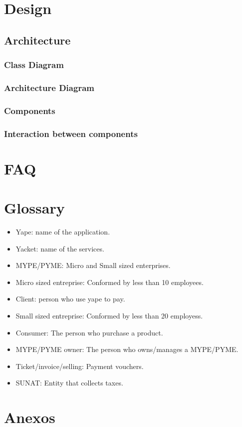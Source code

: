 \documentclass{article}
\begin{document}
\section{Design}
\subsection{Architecture}
\subsubsection{Class Diagram}
\subsubsection{Architecture Diagram}
\subsubsection{Components}
\subsubsection{Interaction between components}
\section{FAQ}
\section{Glossary}
\begin{itemize}
    \item Yape: name of the application.
    \item Yacket: name of the services.
    \item MYPE/PYME: Micro and Small sized enterprises.
    \item Micro sized entreprise: Conformed by less than 10 employees.
    \item Client: person who use yape to pay.
    \item Small sized entreprise: Conformed by less than 20 employess.
    \item Consumer: The person who purchase a product.
    \item MYPE/PYME owner: The person who owns/manages a MYPE/PYME.
    \item Ticket/invoice/selling: Payment vouchers.
    \item SUNAT: Entity that collects taxes.
\end{itemize}
\section{Anexos}
\end{document}
